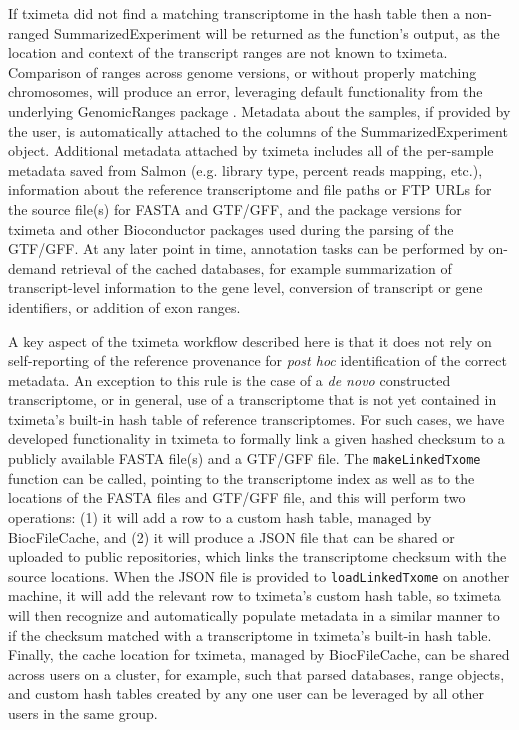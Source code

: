 If tximeta did not find a matching
transcriptome in the hash table then a non-ranged SummarizedExperiment
will be returned as the function's output, as the location and context
of the transcript ranges are not known to tximeta. Comparison of
ranges across genome versions, or without properly matching
chromosomes, will produce an error, leveraging default functionality
from the underlying GenomicRanges package \cite{granges}. Metadata
about the samples, if provided by the user, is automatically attached
to the columns of the SummarizedExperiment object. Additional metadata
attached by tximeta includes all of the per-sample metadata saved from
Salmon (e.g. library type, percent reads mapping, etc.), information
about the reference transcriptome and file paths or FTP URLs for the source file(s)
for FASTA and GTF/GFF, and the package versions for tximeta and other
Bioconductor packages used during the parsing of the GTF/GFF. At any
later point in time, annotation tasks can be performed by on-demand
retrieval of the cached databases, for example summarization of
transcript-level information to the gene level, conversion of
transcript or gene identifiers, or addition of exon ranges.

A key aspect of the tximeta workflow described here is that it does
not rely on self-reporting of the reference provenance for
\textit{post hoc} identification of the correct metadata. An exception
to this rule is the case of a \textit{de novo} constructed
transcriptome, or in general, use of a transcriptome that is not yet
contained in tximeta's built-in hash table of reference
transcriptomes. For such cases, we have developed functionality in
tximeta to formally link a given hashed checksum to a publicly
available FASTA file(s) and a GTF/GFF file. The
\texttt{makeLinkedTxome} function can be called, pointing to the
transcriptome index as well as to the locations of the FASTA files and
GTF/GFF file, and this will perform two operations:
(1) it will add a row to a custom hash
table, managed by BiocFileCache, and (2) it will produce a JSON file
that can be shared or uploaded to public repositories,
which links the transcriptome checksum
with the source locations. When the JSON file is provided to
\texttt{loadLinkedTxome} on another machine, it will add the relevant
row to tximeta's custom hash table, so tximeta will then recognize and
automatically populate metadata in a similar manner to if the checksum
matched with a transcriptome in tximeta's built-in hash
table. Finally, the cache location for tximeta, managed by
BiocFileCache, can be shared across users on a cluster, for example,
such that parsed databases, range objects, and custom hash tables
created by any one user can be leveraged by all other users in the
same group.

